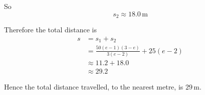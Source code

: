 \documentclass[leqno]{article}
\begin{document}
\begin{enumerate}[
  label=\textbf{\arabic*.},
  leftmargin=*,
  topsep=0pt,
  partopsep=0pt,
  parsep=0pt
]
\begin{djsSolution}
\begin{enumerate}[label=\textbf{(\alph*)}]
  So
  \[
  s_2\approx 18.0\,\mathrm{m}
  \]

  Therefore the total distance is
  \begin{align*}
  s&=s_1+s_2 \\
  &=\frac{50(e-1)(3-e)}{3(e-2)}+25(e-2) \\
  &\approx 11.2+18.0 \\
  &\approx 29.2
  \end{align*}

  Hence the total distance travelled, to the nearest metre, is $29\,\mathrm{m}$.
\end{enumerate}
\end{djsSolution}


\newpage

\questionitem


\end{enumerate}
\end{document}
